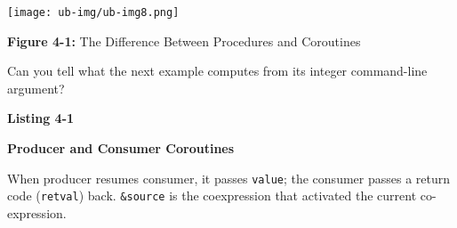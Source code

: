 {\centering \par}

\begin{center}
\texttt{[image: ub-img/ub-img8.png]}
\end{center}

{\sffamily\bfseries Figure 4-1:}
{\sffamily The Difference Between Procedures and Coroutines}

\bigskip

\noindent
Can you tell what the next example computes from its integer
command-line argument?

\bigskip

{\sffamily\bfseries
Listing 4-1}

{\sffamily\bfseries
Producer and Consumer Coroutines}


When producer resumes consumer, it passes \texttt{value}; the consumer
passes a return code (\texttt{retval}) back. \texttt{\&source} is the
coexpression that activated the current co-expression.


